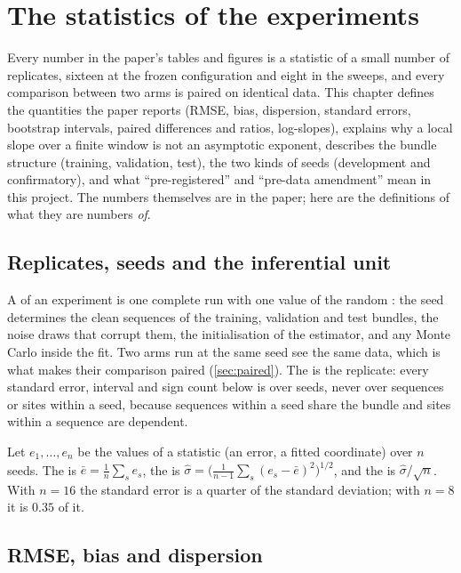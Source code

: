 \chapter{The statistics of the experiments}
\label{ch:experimental-statistics}

Every number in the paper's tables and figures is a statistic of a small number of
replicates, sixteen at the frozen configuration and eight in the sweeps, and every
comparison between two arms is paired on identical data. This chapter defines the
quantities the paper reports (RMSE, bias, dispersion, standard errors, bootstrap
intervals, paired differences and ratios, log-slopes), explains why a local slope
over a finite window is not an asymptotic exponent, describes the bundle structure
(training, validation, test), the two kinds of seeds (development and confirmatory),
and what ``pre-registered'' and ``pre-data amendment'' mean in this project. The
numbers themselves are in the paper; here are the definitions of what they are
numbers \emph{of}.

\section{Replicates, seeds and the inferential unit}

A  of an experiment is one complete run with one value of the random
: the seed determines the clean sequences of the training, validation and
test bundles, the noise draws that corrupt them, the initialisation of the estimator,
and any Monte Carlo inside the fit. Two arms run at the same seed see the same data,
which is what makes their comparison paired (\cref{sec:paired}). The  is the replicate: every standard error, interval and sign count below is over
seeds, never over sequences or sites within a seed, because sequences within a seed
share the bundle and sites within a sequence are dependent.

Let $e_1,\dots,e_n$ be the values of a statistic (an error, a fitted coordinate) over
$n$ seeds. The  is $\bar e=\tfrac1n\sum_se_s$, the  is $\hat\sigma=\bigl(\tfrac1{n-1}\sum_s(e_s-\bar e)^2\bigr)^{1/2}$,
and the  is $\hat\sigma/\sqrt n$. With $n=16$ the
standard error is a quarter of the standard deviation; with $n=8$ it is $0.35$ of it.

\section{RMSE, bias and dispersion}

